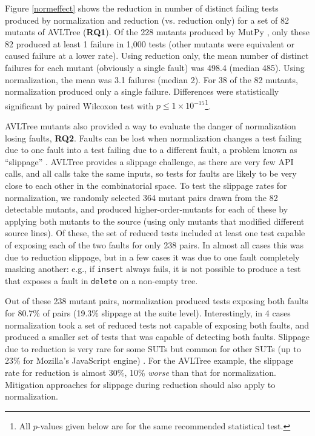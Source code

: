 Figure \ref{normeffect} shows the reduction in number of distinct
failing tests produced by normalization and reduction
(vs. reduction only) for a set of 82 mutants \cite{mutant} of AVLTree
\cite{Hunter:2007} ({\bf RQ1}).  Of the 228 mutants produced by MutPy
\cite{mutpy}, only these 82 produced at least 1 failure in 1,000 tests (other mutants were equivalent or caused failure at a lower
rate).  Using reduction only, the mean number of distinct failures for
each mutant (obviously a single fault) was 498.4 (median 485).  Using normalization, the mean
was 3.1 failures (median 2).  For 38 of the 82 mutants,
normalization produced only a single failure.
Differences were statistically significant by paired Wilcoxon test with
$p\leq1\times10^{-15}$\footnote{All $p$-values given below are for
  the same recommended \cite{arcuri2014hitchhiker} statistical test.}.


AVLTree mutants also provided a way to evaluate the danger of
normalization losing faults, {\bf RQ2}.  Faults can be lost when normalization
changes a test failing due to one fault into a test failing
due to a different fault, a problem known as ``slippage''
\cite{PLDI13,slippage}.  AVLTree provides a slippage challenge, as there are
very few API calls, and all calls take the same inputs, so tests
for faults are likely to be very close to each other in the
combinatorial space.  To test the slippage rates for normalization, we
randomly selected 364 mutant pairs drawn from the 82 detectable
mutants, and produced higher-order-mutants for each of these by
applying both mutants to the source (using only mutants that modified
different source lines).  Of these, the set of reduced tests
included at least one test capable of exposing each of the two faults
for only 238 pairs.  In almost all cases this was due to reduction
slippage, but in a few cases it was due to one fault completely
masking another: e.g., if {\tt insert} always fails, it is not
possible to produce a test that exposes a fault in {\tt delete}
on a non-empty tree.

Out of these 238 mutant pairs, normalization produced tests
exposing both faults for 80.7\% of pairs (19.3\% slippage at the
suite level).  Interestingly, in 4 cases
normalization took a set of reduced tests not capable of exposing
both faults, and produced a smaller set of tests that was capable
of detecting both faults.  Slippage due to
reduction is very rare for some SUTs but common
for other SUTs (up to 23\% for Mozilla's JavaScript engine) \cite{PLDI13}.  For the AVLTree example, the slippage rate for reduction is almost 30\%,
10\% \emph{worse} than that for normalization.  Mitigation approaches
for slippage during reduction \cite{slippage} should also apply to normalization.

